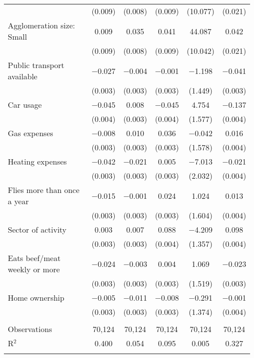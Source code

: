 \begin{tabular}{@{\extracolsep{5pt}}lccccc}
  & (0.009) & (0.008) & (0.009) & (10.077) & (0.021) \\ 
  Agglomeration size: Small & 0.009 & 0.035 & 0.041 & 44.087 & 0.042 \\ 
  & (0.009) & (0.008) & (0.009) & (10.042) & (0.021) \\ 
  Public transport available & $-$0.027 & $-$0.004 & $-$0.001 & $-$1.198 & $-$0.041 \\ 
  & (0.003) & (0.003) & (0.003) & (1.449) & (0.003) \\ 
  Car usage & $-$0.045 & 0.008 & $-$0.045 & 4.754 & $-$0.137 \\ 
  & (0.004) & (0.003) & (0.004) & (1.577) & (0.004) \\ 
  Gas expenses & $-$0.008 & 0.010 & 0.036 & $-$0.042 & 0.016 \\ 
  & (0.003) & (0.003) & (0.003) & (1.578) & (0.004) \\ 
  Heating expenses & $-$0.042 & $-$0.021 & 0.005 & $-$7.013 & $-$0.021 \\ 
  & (0.003) & (0.003) & (0.003) & (2.032) & (0.004) \\ 
  Flies more than once a year & $-$0.015 & $-$0.001 & 0.024 & 1.024 & 0.013 \\ 
  & (0.003) & (0.003) & (0.003) & (1.604) & (0.004) \\ 
  Sector of activity & 0.003 & 0.007 & 0.088 & $-$4.209 & 0.098 \\ 
  & (0.003) & (0.003) & (0.004) & (1.357) & (0.004) \\ 
  Eats beef/meat weekly or more & $-$0.024 & $-$0.003 & 0.004 & 1.069 & $-$0.023 \\ 
  & (0.003) & (0.003) & (0.003) & (1.519) & (0.003) \\ 
  Home ownership & $-$0.005 & $-$0.011 & $-$0.008 & $-$0.291 & $-$0.001 \\ 
  & (0.003) & (0.003) & (0.003) & (1.374) & (0.004) \\ 
 \hline \\[-1.8ex] 

Observations & 70,124 & 70,124 & 70,124 & 70,124 & 70,124 \\ 
R$^{2}$ & 0.400 & 0.054 & 0.095 & 0.005 & 0.327 \\ 
\hline 
\hline \\[-1.8ex] 
\end{tabular} 